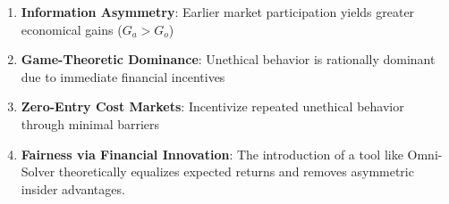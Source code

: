 \documentclass{article}
\begin{document}
\begin{enumerate}
    \item \textbf{Information Asymmetry}: Earlier market participation yields greater economical gains ($G_a > G_o$)
    \item \textbf{Game-Theoretic Dominance}: Unethical behavior is rationally dominant due to immediate financial incentives
    \item \textbf{Zero-Entry Cost Markets}: Incentivize repeated unethical behavior through minimal barriers
    \item \textbf{Fairness via Financial Innovation}: The introduction of a tool like Omni-Solver theoretically equalizes expected returns and removes asymmetric insider advantages.
\end{enumerate}
\end{document}
